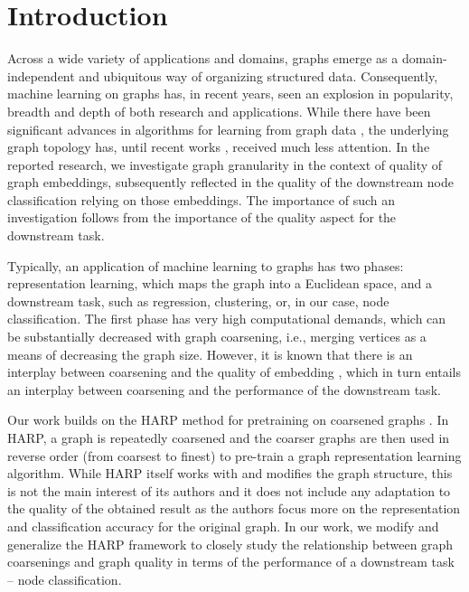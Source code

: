 \section{Introduction}
Across a wide variety of applications and domains, graphs emerge as a domain-independent and ubiquitous way of organizing structured data. Consequently, machine learning on graphs has, in recent years, seen an explosion in popularity, breadth and depth of both research and applications. While there have been significant advances in algorithms for learning from graph data \cite{defferrard_convolutional_2016,kipf_semi-supervised_2017}, the underlying graph topology has, until recent works \cite{topping_understanding_2021,velickovic_geometric_2021}, received much less attention. In the reported research, we investigate graph granularity in the context of quality of graph embeddings, subsequently reflected in the quality of the downstream node classification relying on those embeddings. The importance of such an investigation follows from the importance of the quality aspect for the downstream task.

Typically, an application of machine learning to graphs has two phases: representation learning, which maps the graph into a Euclidean space, and a downstream task, such as regression, clustering, or, in our case, node classification. The first phase has very high computational demands, which can be substantially decreased with graph coarsening, i.e., merging vertices as a means of decreasing the graph size. However, it is known that there is an interplay between coarsening and the quality of embedding \cite{akyildiz_understanding_2020,makarov_survey_2021}, which in turn entails an interplay between coarsening and the performance of the downstream task.

Our work builds on the HARP method for pretraining on coarsened graphs \cite{chen_harp_2018}. In HARP, a graph is repeatedly coarsened and the coarser graphs are then used in reverse order (from coarsest to finest) to pre-train a graph representation learning algorithm. While HARP itself works with and modifies the graph structure, this is not the main interest of its authors and it does not include any adaptation to the quality of the obtained result as the authors focus more on the representation and classification accuracy for the original graph. In our work, we modify and generalize the HARP framework to closely study the relationship between graph coarsenings and graph quality in terms of the performance of a downstream task -- node classification.

